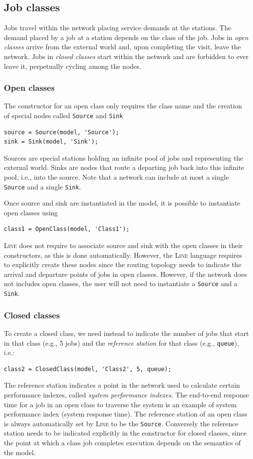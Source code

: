 \subsection{Job classes}
Jobs travel within the network placing service demands at the stations. The demand placed by a job at a station depends on the class of the job. Jobs in {\em open classes} arrive from the external world and, upon completing the visit, leave the network. Jobs in {\em closed classes} start within the network and are forbidden to ever leave it, perpetually cycling among the nodes.

\subsubsection{Open classes}
The constructor for an open class only requires the class name and the creation of special nodes called \texttt{Source} and \texttt{Sink}
\begin{lstlisting}
source = Source(model, 'Source');
sink = Sink(model, 'Sink');
\end{lstlisting}
Sources are special stations holding an infinite pool of jobs and representing the external world. Sinks are nodes that route a departing job back into this infinite pool, i.e., into the source. Note that a network can include at most a single \texttt{Source} and a single \texttt{Sink}.

Once source and sink are instantiated in the model, it is possible to instantiate open classes using
\begin{lstlisting}
class1 = OpenClass(model, 'Class1');
\end{lstlisting}
\textsc{Line} does not require to associate source and sink with the open classes in their constructors, as this is done automatically. However, the \textsc{Line} language requires to explicitly create these nodes since the routing topology needs to indicate the arrival and departure points of jobs in open classes. However, if the network does not includes open classes, the user will not need to instantiate a \texttt{Source} and a \texttt{Sink}.

\subsubsection{Closed classes}
To create a closed class, we need instead to indicate the number of jobs that start in that class (e.g., 5 jobs) and the {\em reference station} for that class (e.g., \texttt{queue}), i.e.:
\begin{lstlisting}
class2 = ClosedClass(model, 'Class2', 5, queue);
\end{lstlisting}
The reference station indicates a point in the network used to calculate certain performance indexes, called {\em system performance indexes}. The end-to-end response time for a job in an open class to traverse the system is an example of system performance index (system response time). The reference station of an open class is always automatically set by \textsc{Line} to be the \texttt{Source}. Conversely the reference station needs to be indicated explicitly in the constructor for closed classes, since the point at which a class job completes execution depends on the semantics of the model.

